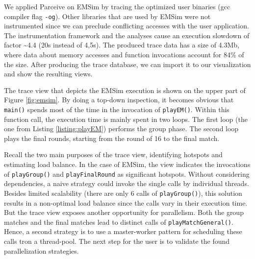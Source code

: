 We applied Parceive on EMSim by tracing the optimized user binaries (gcc
compiler flag \texttt{-og}). Other libraries that are used by EMSim were not
instrumented since we can preclude conflicting accesses with the user
application. The instrumentation framework and the analyses cause an execution
slowdown of factor \textasciitilde 4.4 (20s instead of 4,5s). The produced
trace data has a size of 4.3Mb, where data about memory accesses and function
invocations account for 84\% of the size. After producing the trace database,
we can import it to our visualization and show the resulting views.

The trace view that depicts the EMSim execution is shown on the upper part
of Figure \ref{fig:emsim}. By doing a top-down inspection, it becomes obvious
that \texttt{main()} spends most of the time in the invocation of
\texttt{playEM()}. Within this function call, the execution time is mainly
spent in two loops. The first loop (the one from Listing \ref{listing:playEM})
performs the group phase. The second loop plays the final rounds, starting from
the round of 16 to the final match. 

Recall the two main purposes of the trace view, identifying hotspots
and estimating load balance. In the case of EMSim, the view indicates the
invocations of \texttt{playGroup()} and \texttt{playFinalRound} as significant
hotspots. Without considering dependencies, a naive strategy could invoke the
single calls by individual threads. Besides limited scalability (there are only
6 calls of \texttt{playGroup()}), this solution results in a non-optimal load
balance since the calls vary in their execution time. But the trace view
exposes another opportunity for parallelism. Both the group matches and the
final matches lead to distinct calls of \texttt{playMatchGeneral()}. Hence,
a second strategy is to use a master-worker pattern for scheduling these calls
tron a thread-pool. The next step for the user is to validate the found
parallelization strategies.

